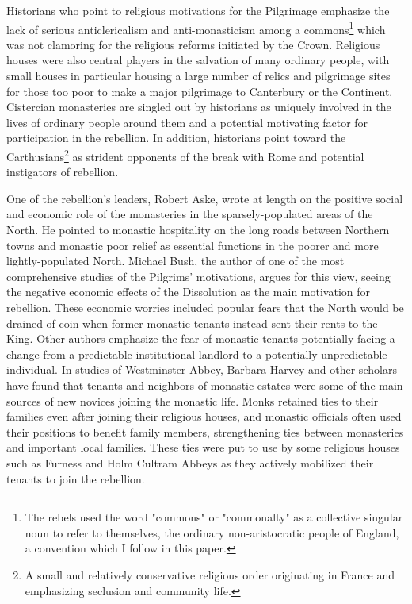 \documentclass[12pt]{article}
\begin{document}
Historians who point to religious motivations for the Pilgrimage emphasize the lack of serious anticlericalism and anti-monasticism among a commons\footnote{The rebels used the word "commons" or "commonalty" as a collective singular noun to refer to themselves, the ordinary non-aristocratic people of England, a convention which I follow in this paper.} which was not clamoring for the religious reforms initiated by the Crown.\autocite[208]{McRee2004} Religious houses were also central players in the salvation of many ordinary people, with small houses in particular housing a large number of relics and pilgrimage sites for those too poor to make a major pilgrimage to Canterbury or the Continent.\autocite[424-5]{Heale2007} Cistercian monasteries are singled out by historians as uniquely involved in the lives of ordinary people around them and a potential motivating factor for participation in the rebellion.\autocite[83,88]{Carter2015} In addition, historians point toward the Carthusians\footnote{A small and relatively conservative religious order originating in France and emphasizing seclusion and community life.} as strident opponents of the break with Rome and potential instigators of rebellion.\autocite[267]{Clark2021}

One of the rebellion's leaders, Robert Aske, wrote at length on the positive social and economic role of the monasteries in the sparsely-populated areas of the North. He pointed to monastic hospitality on the long roads between Northern towns and monastic poor relief as essential functions in the poorer and more lightly-populated North.\autocite[12]{Harrison1981} Michael Bush, the author of one of the most comprehensive studies of the Pilgrims' motivations, argues for this view, seeing the negative economic effects of the Dissolution as the main motivation for rebellion.\autocite[17-18]{Bush1996} These economic worries included popular fears that the North would be drained of coin when former monastic tenants instead sent their rents to the King.\autocite[60]{Davies1968} Other authors emphasize the fear of monastic tenants potentially facing a change from a predictable institutional landlord to a potentially unpredictable individual.\autocite[20]{Youings1971} In studies of Westminster Abbey, Barbara Harvey and other scholars have found that tenants and neighbors of monastic estates were some of the main sources of new novices joining the monastic life.\autocite[75-6]{Harvey1993} Monks retained ties to their families even after joining their religious houses, and monastic officials often used their positions to benefit family members, strengthening ties between monasteries and important local families.\autocite[64]{Clark2021} These ties were put to use by some religious houses such as Furness and Holm Cultram Abbeys as they actively mobilized their tenants to join the rebellion.\autocite[64,66]{Davies1968}
\end{document}
